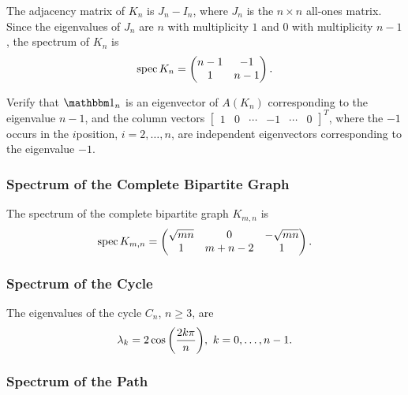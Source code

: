 The adjacency matrix of $K_n$ is $J_n - I_n$, where $J_n$ is the $n \times n$ all-ones matrix. Since the eigenvalues of $J_n$ are $n$ with multiplicity $1$ and $0$ with multiplicity $n - 1$, the spectrum of $K_n$ is
\begin{equation*}
\operatorname{spec} K_n = \begin{pmatrix}
n - 1 & -1 \\
1 & n - 1
\end{pmatrix}.
\end{equation*}

\begin{Exercise}
Verify that $\mathbbm 1_n$ is an eigenvector of $A(K_n)$ corresponding to the eigenvalue $n - 1$, and the column vectors $\begin{bmatrix}1 & 0 & \cdots & -1 & \cdots & 0\end{bmatrix}^T$, where the $-1$ occurs in the $i$\nth position, $i = 2, \ldots, n$, are independent eigenvectors corresponding to the eigenvalue $-1$.
\end{Exercise}

\subsubsection*{Spectrum of the Complete Bipartite Graph}\label{subsubsec:KmnSpectrum}

The spectrum of the complete bipartite graph $K_{m,n}$ is
\begin{equation*}
\operatorname{spec} K_{m,n} = \begin{pmatrix}
\sqrt{mn} & 0 & -\sqrt{mn} \\
1 & m + n - 2 & 1
\end{pmatrix}.
\end{equation*}

\subsubsection*{Spectrum of the Cycle}\label{subsubsec:CnSpectrum}

The eigenvalues of the cycle $C_n$, $n \ge 3$, are
\begin{equation*}
\lambda_k = 2 \cos \pqty{\dfrac{2k\pi}{n}},~ k = 0, \ldots, n - 1.
\end{equation*}

\subsubsection*{Spectrum of the Path}\label{subsubsec:PnSpectrum}

